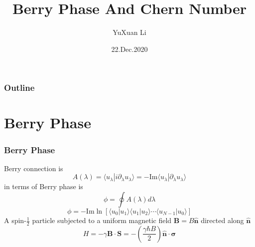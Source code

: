 \documentclass{beamer}
\title[CMT.SCNU]{Berry Phase And Chern Number}
\author[YuXuan Li]
{YuXuan Li\inst{1}}
\institute[Physics@SCNU] 
{
  \inst{1}%
  Department of Physics\\
 South China Normal University 
}
\date[SCNU]{22.Dec.2020}
\begin{document}
  \frame{\titlepage}

  \begin{frame}
    \frametitle{Outline}
    \tableofcontents
  \end{frame}
\section{Berry Phase}
\begin{frame}
\frametitle{Berry Phase}
Berry connection is 
\begin{equation}
A(\lambda)=\langle u_\lambda|i\partial_\lambda u_\lambda\rangle=-\textrm{Im}\langle u_\lambda|\partial_\lambda u_\lambda\rangle
\end{equation}
in terms of Berry phase is 
\begin{equation}
\phi=\oint A(\lambda)d\lambda
\end{equation}
\begin{equation}
\phi=-\textrm{Im}\ln\left[\langle u_0|u_1\rangle\langle u_1|u_2\rangle\cdots\langle u_{N-1}|u_0\rangle\right]
\end{equation}
A spin-$\frac{1}{2}$ particle subjected to a uniform magnetic field $\mathbf{B}=B\hat{\mathbf{n}}$ directed along $\hat{\mathbf{n}}$
\begin{equation}
H=-\gamma \mathbf{B}\cdot \mathbf{S}=-(\frac{\gamma\hbar B}{2})\hat{\mathbf{n}}\cdot \mathbf{\sigma}
\end{equation}
\end{frame}
\end{document}

